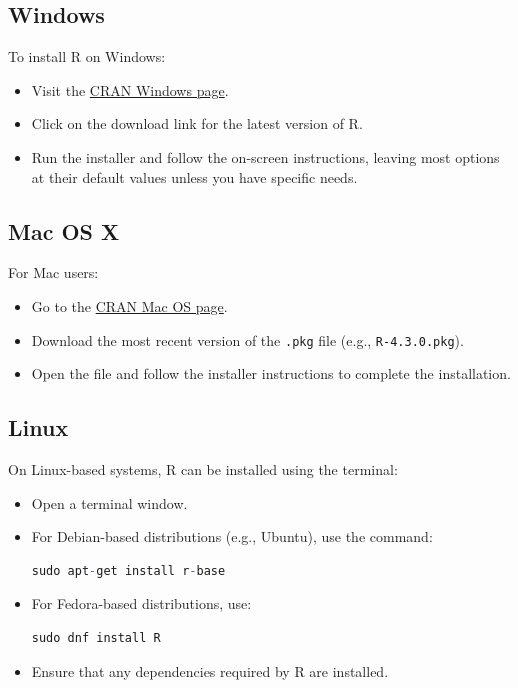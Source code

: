 \documentclass[10pt]{book}
\begin{document}
\subsection{Windows}
To install R on Windows:
\begin{itemize}
    \item Visit the \href{https://cran.r-project.org/bin/windows/base/}{CRAN Windows page}.
    \item Click on the download link for the latest version of R.
    \item Run the installer and follow the on-screen instructions, leaving most options at their default values unless you have specific needs.
\end{itemize}

\subsection{Mac OS X}
For Mac users:
\begin{itemize}
    \item Go to the \href{https://cran.r-project.org/bin/macosx/}{CRAN Mac OS page}.
    \item Download the most recent version of the \texttt{.pkg} file (e.g., \texttt{R-4.3.0.pkg}).
    \item Open the file and follow the installer instructions to complete the installation.
\end{itemize}

\subsection{Linux}
On Linux-based systems, R can be installed using the terminal:
\begin{itemize}
    \item Open a terminal window.
    \item For Debian-based distributions (e.g., Ubuntu), use the command:
    \begin{lstlisting}[language=R]
    sudo apt-get install r-base
    \end{lstlisting}
    \item For Fedora-based distributions, use:
    \begin{lstlisting}[language=R]
    sudo dnf install R
    \end{lstlisting}
    \item Ensure that any dependencies required by R are installed.
\end{itemize}
\end{document}
